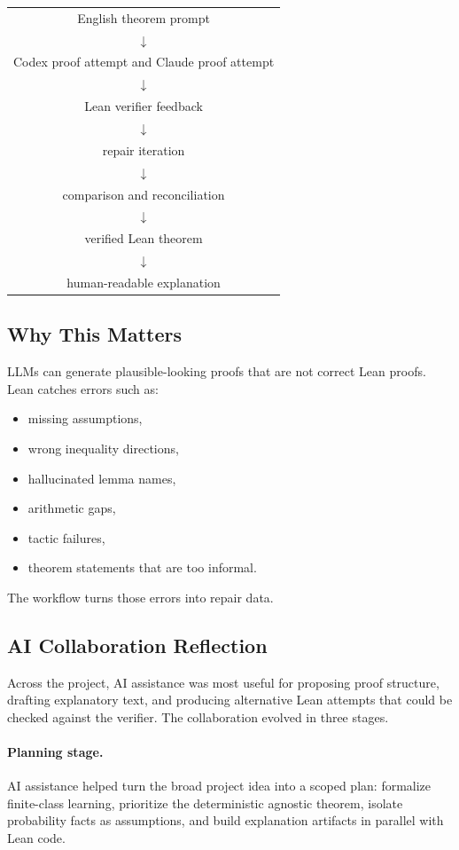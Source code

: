 \documentclass[11pt]{article}
\theoremstyle{definition}
\begin{document}
\begin{center}
\begin{tabular}{c}
English theorem prompt \\
$\downarrow$ \\
Codex proof attempt and Claude proof attempt \\
$\downarrow$ \\
Lean verifier feedback \\
$\downarrow$ \\
repair iteration \\
$\downarrow$ \\
comparison and reconciliation \\
$\downarrow$ \\
verified Lean theorem \\
$\downarrow$ \\
human-readable explanation
\end{tabular}
\end{center}

\subsection{Why This Matters}

LLMs can generate plausible-looking proofs that are not correct Lean proofs.
Lean catches errors such as:
\begin{itemize}[leftmargin=*]
  \item missing assumptions,
  \item wrong inequality directions,
  \item hallucinated lemma names,
  \item arithmetic gaps,
  \item tactic failures,
  \item theorem statements that are too informal.
\end{itemize}

The workflow turns those errors into repair data.

\subsection{AI Collaboration Reflection}

Across the project, AI assistance was most useful for proposing proof structure,
drafting explanatory text, and producing alternative Lean attempts that could be
checked against the verifier. The collaboration evolved in three stages.

\paragraph{Planning stage.}
AI assistance helped turn the broad project idea into a scoped plan: formalize
finite-class learning, prioritize the deterministic agnostic theorem, isolate
probability facts as assumptions, and build explanation artifacts in parallel
with Lean code.
\end{document}

